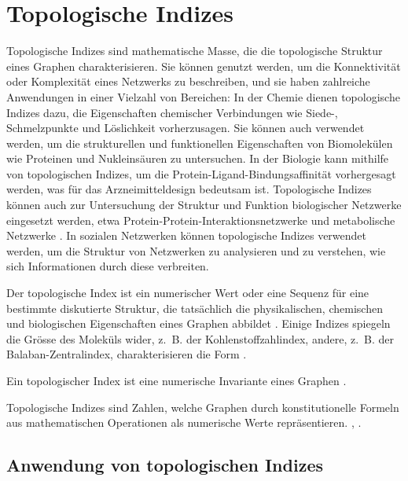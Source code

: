 \section{Topologische Indizes} \label{sec:topologische_indizes}

Topologische Indizes sind mathematische Masse, die die topologische Struktur eines Graphen charakterisieren.
Sie können genutzt werden, um die Konnektivität oder Komplexität eines Netzwerks zu beschreiben, und sie haben zahlreiche Anwendungen in einer Vielzahl von Bereichen:
In der Chemie dienen topologische Indizes dazu, die Eigenschaften chemischer Verbindungen wie Siede-, Schmelzpunkte und Löslichkeit vorherzusagen.
Sie können auch verwendet werden, um die strukturellen und funktionellen Eigenschaften von Biomolekülen wie Proteinen und Nukleinsäuren zu untersuchen.
In der Biologie kann mithilfe von topologischen Indizes, um die Protein-Ligand-Bindungsaffinität vorhergesagt werden, was für das Arzneimitteldesign bedeutsam ist.
Topologische Indizes können auch zur Untersuchung der Struktur und Funktion biologischer Netzwerke eingesetzt werden, etwa Protein-Protein-Interaktionsnetzwerke und metabolische Netzwerke \cite[p.~199ff]{balaban_topological_1983}.
In sozialen Netzwerken können topologische Indizes verwendet werden, um die Struktur von Netzwerken zu analysieren und zu verstehen, wie sich Informationen durch diese verbreiten.

Der topologische Index ist ein numerischer Wert oder eine Sequenz für eine bestimmte diskutierte Struktur, die tatsächlich die physikalischen, chemischen und biologischen Eigenschaften eines Graphen abbildet \cite{manzoor_entropy_2020}.
Einige Indizes spiegeln die Grösse des Moleküls wider, z. B. der Kohlenstoffzahlindex, andere, z. B. der Balaban-Zentralindex, charakterisieren die Form \cite[p.~1]{rouvray_modeling_1987}.
\begin{theorem}
    \label{thm:topologischer_index}%
    Ein topologischer Index ist eine numerische Invariante eines Graphen \cite[p.~235]{plavsic_harary_1993}.

    Topologische Indizes sind Zahlen, welche Graphen durch konstitutionelle Formeln aus mathematischen Operationen als numerische Werte repräsentieren. \cite[p.~16]{devillers_topological_2000}, \cite[p.~23]{devillers_topological_2000}.
\end{theorem}

\newpage
\subsection{Anwendung von topologischen Indizes}


